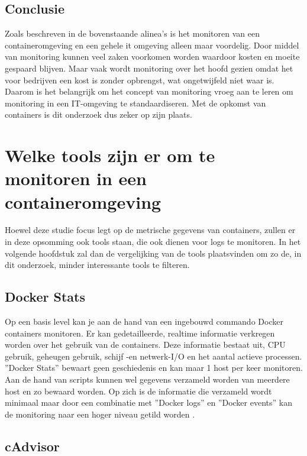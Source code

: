 \subsection{Conclusie}

Zoals beschreven in de bovenstaande alinea's is het monitoren van een containeromgeving en een gehele it omgeving alleen maar voordelig.  Door middel van monitoring kunnen veel zaken voorkomen worden waardoor kosten en moeite gespaard blijven. Maar vaak wordt monitoring over het hoofd gezien omdat het voor bedrijven een kost is zonder opbrengst, wat ongetwijfeld niet waar is. Daarom is het belangrijk om het concept van monitoring vroeg aan te leren om monitoring in een IT-omgeving te standaardiseren. Met de opkomst van containers is dit onderzoek dus zeker op zijn plaats.

\section{Welke tools zijn er om te monitoren in een containeromgeving}

Hoewel deze studie focus legt op de metrische gegevens van containers, zullen er in deze opsomming ook tools staan, die ook dienen voor logs te monitoren. In het volgende hoofdstuk zal dan de vergelijking van de tools plaatsvinden om zo de, in dit onderzoek, minder interessante tools te filteren.

\subsection{Docker Stats}

Op een basis level kan je aan de hand van een ingebouwd commando Docker containers monitoren. Er kan gedetailleerde, realtime informatie verkregen worden over het gebruik van de containers. Deze informatie bestaat uit, CPU gebruik, geheugen gebruik, schijf -en netwerk-I/O en het aantal actieve processen. ''Docker Stats'' bewaart geen geschiedenis en kan maar 1 host per keer monitoren. Aan de hand van scripts kunnen wel gegevens verzameld worden van meerdere host en zo bewaard worden. Op zich is de informatie die verzameld wordt minimaal maar door een combinatie met ''Docker logs'' en ''Docker events''  kan de monitoring naar een hoger niveau getild worden \autocite{Sissons2021}.  

\subsection{cAdvisor}

